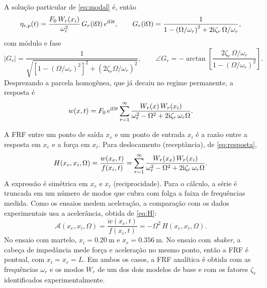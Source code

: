 A solução particular de \eqref{eq:modal} é, então
\begin{equation}
    \eta_{r,p}(t) = \frac{F_0\,W_r(x_i)}{\omega_r^2}\,G_r(\mathrm{i}\Omega)\,e^{\mathrm{i}\Omega t},
    \qquad
    G_r(\mathrm{i}\Omega) = \frac{1}{1 - \left(\Omega/\omega_r\right)^2
        + 2\mathrm{i}\zeta_r\,\Omega/\omega_r},
    \label{eq:eta_p}
\end{equation}
com módulo e fase
\begin{equation}
    |G_r| = \frac{1}{\sqrt{\left[1 - (\Omega/\omega_r)^2\right]^2
            + \left(2\zeta_r\Omega/\omega_r\right)^2}},
    \qquad
    \angle G_r = -\arctan \left[ \frac{2\zeta_r\,\Omega/\omega_r}{1 - (\Omega/\omega_r)^2} \right].
\end{equation}
Desprezando a parcela homogênea, que já decaiu no regime permanente, a resposta é
\begin{equation}
    w(x,t) = F_0\,e^{\mathrm{i}\Omega t}\sum_{r=1}^{\infty}
    \frac{W_r(x)\,W_r(x_i)}{\omega_r^2 - \Omega^2 + 2\mathrm{i}\zeta_r\,\omega_r\Omega}.
    \label{eq:resposta}
\end{equation}

A FRF entre um ponto de saída $x_e$ e um ponto de entrada $x_i$ é a razão entre a
resposta em $x_e$ e a força em $x_i$. Para deslocamento (receptância), de
\eqref{eq:resposta},
\begin{equation}
    H(x_e, x_i, \Omega) = \frac{w(x_e,t)}{f(x_i,t)}
    = \sum_{r=1}^{\infty}
    \frac{W_r(x_e)\,W_r(x_i)}{\omega_r^2 - \Omega^2 + 2\mathrm{i}\zeta_r\,\omega_r\Omega}.
    \label{eq:H}
\end{equation}
A expressão é simétrica em $x_e$ e $x_i$ (reciprocidade). Para o cálculo, a série é
truncada em um número de modos que cubra com folga a faixa de frequências medida.
Como os ensaios medem aceleração, a comparação com os dados experimentais usa a
acelerância, obtida de \eqref{eq:H}:
\begin{equation}
    \mathcal{A}(x_e, x_i, \Omega) = \frac{\ddot w(x_e,t)}{f(x_i,t)}
    = -\Omega^2\,H(x_e, x_i, \Omega).
    \label{eq:acelerancia}
\end{equation}
No ensaio com martelo, $x_i = \SI{0.20}{\meter}$ e $x_e = \SI{0.356}{\meter}$. No
ensaio com \emph{shaker}, a cabeça de impedância mede força e aceleração no mesmo
ponto, então a FRF é pontual, com $x_i = x_e = L$. Em ambos os casos, a FRF analítica é
obtida com as frequências $\omega_r$ e os modos $W_r$ de um dos dois modelos de base e
com os fatores $\zeta_r$ identificados experimentalmente.


